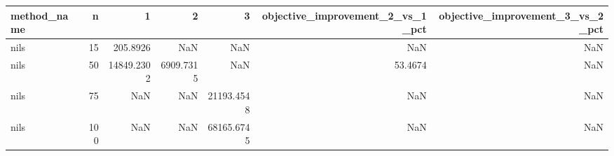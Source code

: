 \begin{tabular}{lrrrrrr}
\toprule
method_name & n & 1 & 2 & 3 & objective_improvement_2_vs_1_pct & objective_improvement_3_vs_2_pct \\
\midrule
nils & 15 & 205.8926 & NaN & NaN & NaN & NaN \\
nils & 50 & 14849.2302 & 6909.7315 & NaN & 53.4674 & NaN \\
nils & 75 & NaN & NaN & 21193.4548 & NaN & NaN \\
nils & 100 & NaN & NaN & 68165.6745 & NaN & NaN \\
\bottomrule
\end{tabular}
